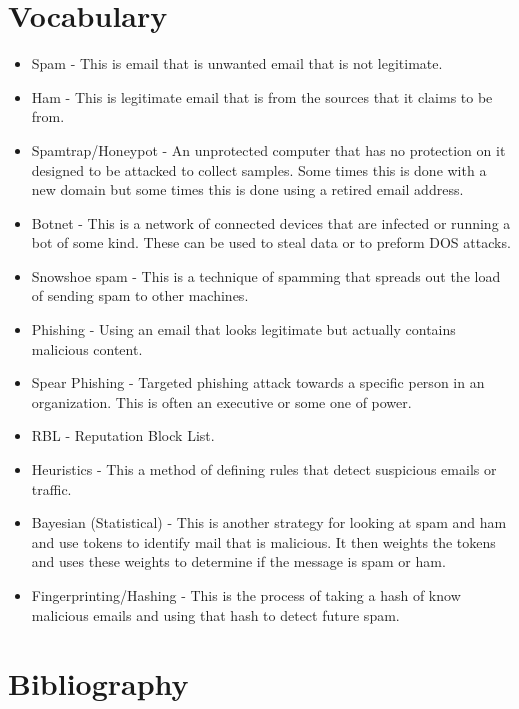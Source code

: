 \documentclass[letterpaper, onecolumn,10pt]{IEEEtran}
\begin{document}
		\section{Vocabulary}
		    \begin{itemize}
		        \item Spam - This is email that is unwanted email that is not legitimate.\\
		        \item Ham - This is legitimate email that is from the sources that it claims to be from.\\
		        \item Spamtrap/Honeypot - An unprotected computer that has no protection on it designed to be attacked to collect samples. Some times this is done with a new domain but some times this is done using a retired email address.\\
		        \item Botnet - This is a network of connected devices that are infected or running a bot of some kind. These can be used to steal data or to preform DOS attacks.\\
		        \item Snowshoe spam - This is a technique of spamming that spreads out the load of sending spam to other machines.\\
		        \item Phishing - Using an email that looks legitimate but actually contains malicious content.\\
		        \item Spear Phishing - Targeted phishing attack towards a specific person in an organization. This is often an executive or some one of power.\\
		        \item RBL - Reputation Block List.\\
		        \item Heuristics - This a method of defining rules that detect suspicious emails or traffic.\\
		        \item Bayesian (Statistical) - This is another strategy for looking at spam and ham and use tokens to identify mail that is malicious. It then weights the tokens and uses these weights to determine if the message is spam or ham.\\
		        \item Fingerprinting/Hashing - This is the process of taking a hash of know malicious emails and using that hash to detect future spam.\\
		    \end{itemize}
			
		\section{Bibliography}
		
		
\end{document}
